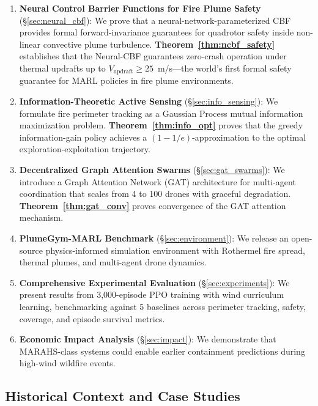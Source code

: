 \documentclass[12pt,a4paper]{article}
\begin{document}
\begin{enumerate}[leftmargin=*, label=\textbf{C\arabic*}]
    \item \textbf{Neural Control Barrier Functions for Fire Plume Safety} (\S\ref{sec:neural_cbf}): We prove that a neural-network-parameterized CBF provides formal forward-invariance guarantees for quadrotor safety inside non-linear convective plume turbulence. \textbf{Theorem~\ref{thm:ncbf_safety}} establishes that the Neural-CBF guarantees zero-crash operation under thermal updrafts up to $V_{\text{updraft}} \geq 25$~m/s---the world's first formal safety guarantee for MARL policies in fire plume environments.

    \item \textbf{Information-Theoretic Active Sensing} (\S\ref{sec:info_sensing}): We formulate fire perimeter tracking as a Gaussian Process mutual information maximization problem. \textbf{Theorem~\ref{thm:info_opt}} proves that the greedy information-gain policy achieves a $(1-1/e)$-approximation to the optimal exploration-exploitation trajectory.

    \item \textbf{Decentralized Graph Attention Swarms} (\S\ref{sec:gat_swarms}): We introduce a Graph Attention Network (GAT) architecture for multi-agent coordination that scales from 4 to 100 drones with graceful degradation. \textbf{Theorem~\ref{thm:gat_conv}} proves convergence of the GAT attention mechanism.

    \item \textbf{PlumeGym-MARL Benchmark} (\S\ref{sec:environment}): We release an open-source physics-informed simulation environment with Rothermel fire spread, thermal plumes, and multi-agent drone dynamics.

    \item \textbf{Comprehensive Experimental Evaluation} (\S\ref{sec:experiments}): We present results from 3,000-episode PPO training with wind curriculum learning, benchmarking against 5 baselines across perimeter tracking, safety, coverage, and episode survival metrics.

    \item \textbf{Economic Impact Analysis} (\S\ref{sec:impact}): We demonstrate that MARAHS-class systems could enable earlier containment predictions during high-wind wildfire events.
\end{enumerate}

\subsection{Historical Context and Case Studies}
\label{sec:case_studies}
\end{document}
